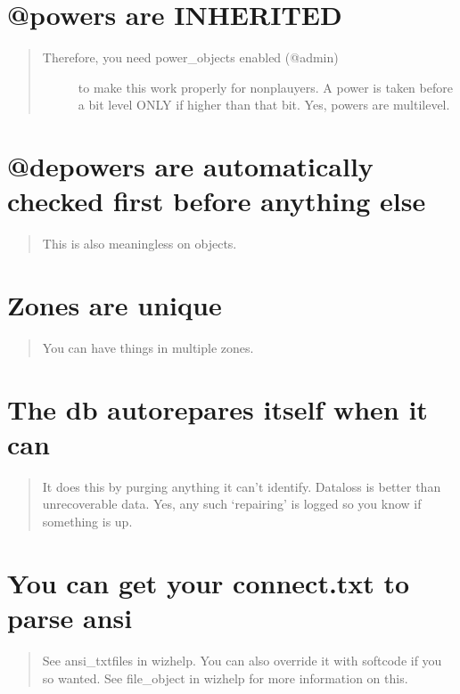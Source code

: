 \documentclass[letterpaper,10pt,english]{sphinxmanual}
\begin{document}
\section{@powers are INHERITED}
\label{\detokenize{23-random:powers-are-inherited}}\begin{quote}
\begin{description}
\item[{Therefore, you need power\_objects enabled (@admin)}] \leavevmode
\sphinxAtStartPar
to make this work properly for non\sphinxhyphen{}plauyers.
A power is taken before a bit level ONLY if higher than that bit.
Yes, powers are multi\sphinxhyphen{}level.

\end{description}
\end{quote}


\section{@depowers are automatically checked first before anything else}
\label{\detokenize{23-random:depowers-are-automatically-checked-first-before-anything-else}}\begin{quote}

\sphinxAtStartPar
This is also meaningless on objects.
\end{quote}


\section{Zones are unique}
\label{\detokenize{23-random:zones-are-unique}}\begin{quote}

\sphinxAtStartPar
You can have things in multiple zones.
\end{quote}


\section{The db auto\sphinxhyphen{}repares itself when it can}
\label{\detokenize{23-random:the-db-auto-repares-itself-when-it-can}}\begin{quote}

\sphinxAtStartPar
It does this by purging anything
it can’t identify.  Dataloss is better than unrecoverable data.
Yes, any such ‘repairing’ is logged so you know if something is up.
\end{quote}


\section{You can get your connect.txt to parse ansi}
\label{\detokenize{23-random:you-can-get-your-connect-txt-to-parse-ansi}}\begin{quote}

\sphinxAtStartPar
See ansi\_txtfiles in wizhelp.
You can also override it with softcode if you so wanted.
See file\_object in wizhelp for more information on this.
\end{quote}
\end{document}
